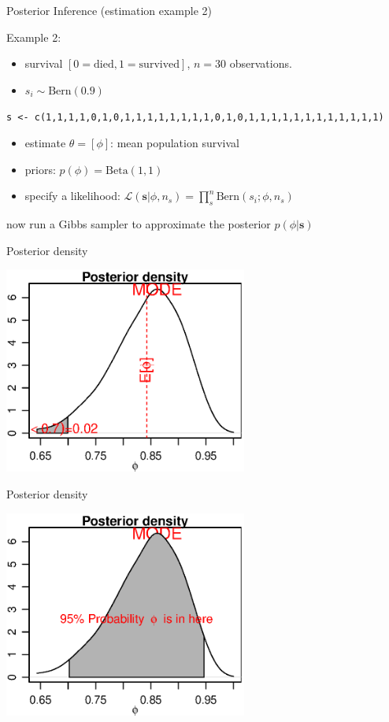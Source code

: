 \documentclass[presentation,9pt,xcolor=dvipsnames]{beamer}
\begin{document}
\begin{frame}[fragile,label={sec:org21d0b86}]{Posterior Inference (estimation example 2)}
 \begin{block}{Example 2:}
\begin{itemize}
\item survival \([0=\text{died},1=\text{survived}]\), \(n=30\) observations.
\item \(s_i\sim\text{Bern}(0.9)\)
\end{itemize}
\texttt{s <- c(1,1,1,1,0,1,0,1,1,1,1,1,1,1,1,0,1,0,1,1,1,1,1,1,1,1,1,1,1,1)}
\begin{itemize}
\item estimate \(\theta=[\phi]\): mean population survival
\item priors:  \(p(\phi)=\text{Beta}(1,1)\)
\item specify a likelihood: \(\mathcal{L}(\mathbf{s}\vert\phi,n_s)=\prod_s^n\text{Bern}(s_i; \phi,n_s)\)
\end{itemize}
\alert{now run a Gibbs sampler to approximate the posterior} \(p(\phi\vert \mathbf{s})\)
\end{block}
\end{frame}
\begin{frame}[label={sec:org5e60db4}]{Posterior density}
\begin{center}
\includegraphics[width=0.6\textwidth,height=0.6\textheight]{posterior_s3.eps}
\end{center}
\end{frame}
\begin{frame}[label={sec:org4626cae}]{Posterior density}
\begin{center}
\includegraphics[width=0.6\textwidth,height=0.6\textheight]{posterior_s4.eps}
\end{center}
\end{frame}
\end{document}
